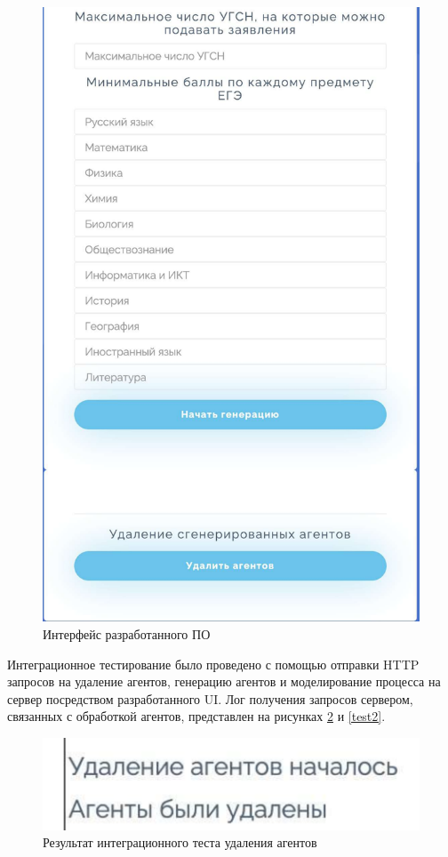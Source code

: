 \begin{figure}[hbtp]
	\centering
	\includegraphics[scale=0.2]{img/ui2.pdf}
	\caption{Интерфейс разработанного ПО}
	\label{ui2}
\end{figure}

Интеграционное тестирование было проведено с помощью отправки HTTP запросов на удаление агентов, генерацию агентов и моделирование процесса на сервер посредством разработанного UI. Лог получения запросов сервером, связанных с обработкой агентов, представлен на рисунках \ref{test1} и \ref{test2}.

\begin{figure}[hbtp]
	\centering
	\includegraphics[scale=0.6]{img/test1.pdf}
	\caption{Результат интеграционного теста удаления агентов}
	\label{test1}
\end{figure}

